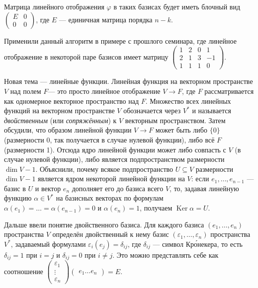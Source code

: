 \documentclass[10pt, a4paper]{extarticle}
\newcommand{\Ker}{\mathop{\mathrm{Ker}}}
\theoremstyle{definition}
\begin{document}
Матрица линейного отображения $\varphi$ в таких базисах будет иметь блочный вид $\begin{pmatrix} E & 0 \\ 0 & 0 \end{pmatrix}$, где $E$ --- единичная матрица порядка $n-k$.

Применили данный алгоритм в примере с прошлого семинара, где линейное отображение в некоторой паре базисов имеет матрицу $\begin{pmatrix} 1 & 2 & 0 & 1 \\ 2 & 1 & 3 & -1 \\ 1 & 1 & 1 & 0\end{pmatrix}$.

Новая тема --- линейные функции.
Линейная функция на векторном пространстве $V$ над полем $F$--- это просто линейное отображение $V \to F$, где $F$ рассматривается как одномерное векторное пространство над $F$.
Множество всех линейных функций на векторном пространстве $V$ обозначается через $V^*$ и называется \textit{двойственным} (или \textit{сопряжённым}) к $V$ векторным пространством.
Затем обсудили, что образом линейной функции $V \to F$ может быть либо $\lbrace 0 \rbrace$ (размерности 0, так получается в случае нулевой функции), либо всё $F$ (размерности 1).
Отсюда ядро линейной функции может либо совпасть с $V$ (в случае нулевой функции), либо является подпространством размерности $\dim V - 1$.
Объяснили, почему всякое подпространство $U \subseteq V$ размерности $\dim V - 1$ является ядром некоторой линейной функции на $V$: если $e_1,\dots, e_{n-1}$ --- базис в $U$ и вектор $e_n$ дополняет его до базиса всего $V$, то, задавая линейную функцию $\alpha \in V^*$ на базисных векторах по формулам $\alpha(e_1) = \dots = \alpha(e_{n-1}) = 0$ и $\alpha(e_n)=1$, получаем $\Ker \alpha = U$.

Дальше ввели понятие двойственного базиса.
Для каждого базиса $(e_1,\dots,e_n)$ пространства $V$ определён двойственный к нему базис $(\varepsilon_1,\dots, \varepsilon_n)$ пространства $V^*$, задаваемый формулами $\varepsilon_i(e_j) = \delta_{ij}$, где $\delta_{ij}$ --- символ Кр\'{о}некера, то есть $\delta_{ij} = 1$ при $i=j$ и $\delta_{ij} = 0$ при $i \ne j$.
Это можно представлять себе как соотношение $\begin{pmatrix} \varepsilon_1 \\ \vdots \\ \varepsilon_n \end{pmatrix} \begin{pmatrix} e_1 \dots e_n \end{pmatrix} = E$.
\end{document}
